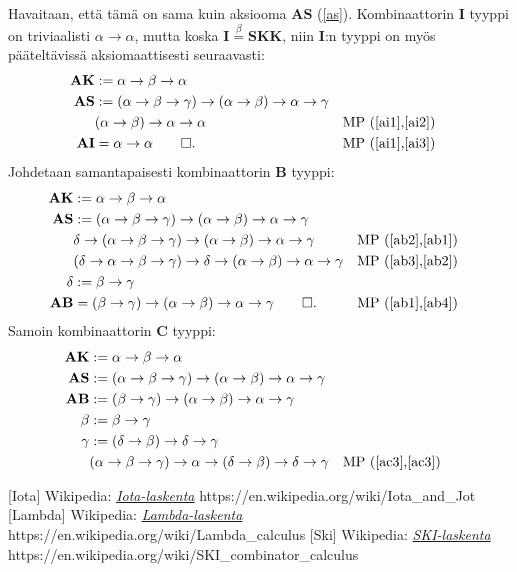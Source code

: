 \documentclass[a4paper,12pt]{amsart}
\begin{document}
Havaitaan, että tämä on sama kuin aksiooma $\mathbf{AS}$ (\ref{as}). Kombinaattorin $\mathbf{I}$ tyyppi on triviaalisti $\alpha\to\alpha$, mutta koska $\mathbf{I}\stackrel{\beta}{=}\mathbf{SKK}$, niin $\mathbf{I}$:n tyyppi on myös pääteltävissä aksiomaattisesti seuraavasti:
\begin{align}
\mathbf{AK} &:= \alpha\to\beta\to\alpha \label{ai1} \\
\mathbf{AS} &:= (\alpha\to\beta\to\gamma)\to(\alpha\to\beta)\to\alpha\to\gamma \label{ai2} \\
& (\alpha\to\beta)\to\alpha\to\alpha && \text{MP (\ref{ai1},\ref{ai2})} \label{ai3} \\
\mathbf{AI} &= \alpha\to\alpha\qed. && \text{MP (\ref{ai1},\ref{ai3})}
\end{align}
Johdetaan samantapaisesti kombinaattorin $\mathbf{B}$ tyyppi:
\begin{align}
\mathbf{AK} &:= \alpha\to\beta\to\alpha \label{ab1} \\
\mathbf{AS} &:= (\alpha\to\beta\to\gamma)\to(\alpha\to\beta)\to\alpha\to\gamma \label{ab2} \\
& \delta\to(\alpha\to\beta\to\gamma)\to(\alpha\to\beta)\to\alpha\to\gamma && \text{MP (\ref{ab2},\ref{ab1})} \label{ab3} \\
& (\delta\to\alpha\to\beta\to\gamma)\to\delta\to(\alpha\to\beta)\to\alpha\to\gamma && \text{MP (\ref{ab3},\ref{ab2})} \label{ab4} \\
\delta &:= \beta\to\gamma \\
\mathbf{AB} &= (\beta\to\gamma)\to(\alpha\to\beta)\to\alpha\to\gamma\qed. && \text{MP (\ref{ab1},\ref{ab4})}
\end{align}
Samoin kombinaattorin $\mathbf{C}$ tyyppi:
\begin{align}
\mathbf{AK} &:= \alpha\to\beta\to\alpha \label{ac1} \\
\mathbf{AS} &:= (\alpha\to\beta\to\gamma)\to(\alpha\to\beta)\to\alpha\to\gamma \label{ac2} \\
\mathbf{AB} &:= (\beta\to\gamma)\to(\alpha\to\beta)\to\alpha\to\gamma \label{ac3} \\
\beta &:= \beta\to\gamma \\
\gamma &:= (\delta\to\beta)\to\delta\to\gamma \\
& (\alpha\to\beta\to\gamma)\to\alpha\to(\delta\to\beta)\to\delta\to\gamma && \text{MP (\ref{ac3},\ref{ac3})} \label{ac4} \\
\end{align}

\begin{thebibliography}{99}
[Iota] Wikipedia: \href{https://en.wikipedia.org/wiki/Iota\_and\_Jot}{\emph{Iota-laskenta}}
https://en.wikipedia.org/wiki/Iota\_and\_Jot
[Lambda] Wikipedia: \href{https://en.wikipedia.org/wiki/Lambda\_calculus}{\emph{Lambda-laskenta}} https://en.wikipedia.org/wiki/Lambda\_calculus
[Ski] Wikipedia: \href{https://en.wikipedia.org/wiki/SKI\_combinator\_calculus}{\emph{SKI-laskenta}} https://en.wikipedia.org/wiki/SKI\_combinator\_calculus
\end{thebibliography}
\end{document}
